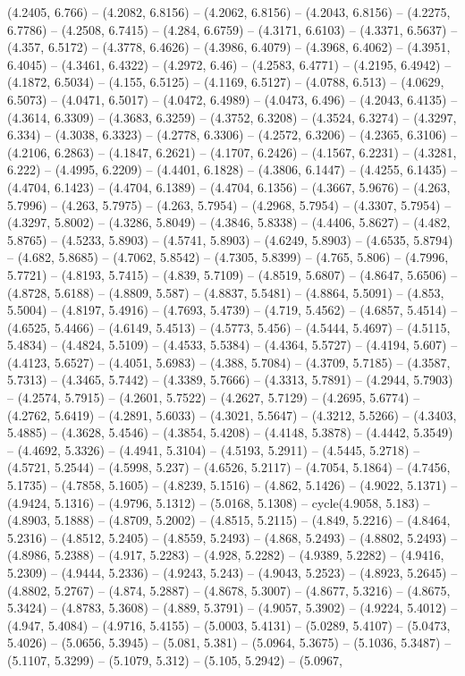 (4.2405, 6.766) -- (4.2082, 6.8156) -- (4.2062, 6.8156) -- (4.2043, 6.8156) -- (4.2275, 6.7786) -- (4.2508, 6.7415) -- (4.284, 6.6759) -- (4.3171, 6.6103) -- (4.3371, 6.5637) -- (4.357, 6.5172) -- (4.3778, 6.4626) -- (4.3986, 6.4079) -- (4.3968, 6.4062) -- (4.3951, 6.4045) -- (4.3461, 6.4322) -- (4.2972, 6.46) -- (4.2583, 6.4771) -- (4.2195, 6.4942) -- (4.1872, 6.5034) -- (4.155, 6.5125) -- (4.1169, 6.5127) -- (4.0788, 6.513) -- (4.0629, 6.5073) -- (4.0471, 6.5017) -- (4.0472, 6.4989) -- (4.0473, 6.496) -- (4.2043, 6.4135) -- (4.3614, 6.3309) -- (4.3683, 6.3259) -- (4.3752, 6.3208) -- (4.3524, 6.3274) -- (4.3297, 6.334) -- (4.3038, 6.3323) -- (4.2778, 6.3306) -- (4.2572, 6.3206) -- (4.2365, 6.3106) -- (4.2106, 6.2863) -- (4.1847, 6.2621) -- (4.1707, 6.2426) -- (4.1567, 6.2231) -- (4.3281, 6.222) -- (4.4995, 6.2209) -- (4.4401, 6.1828) -- (4.3806, 6.1447) -- (4.4255, 6.1435) -- (4.4704, 6.1423) -- (4.4704, 6.1389) -- (4.4704, 6.1356) -- (4.3667, 5.9676) -- (4.263, 5.7996) -- (4.263, 5.7975) -- (4.263, 5.7954) -- (4.2968, 5.7954) -- (4.3307, 5.7954) -- (4.3297, 5.8002) -- (4.3286, 5.8049) -- (4.3846, 5.8338) -- (4.4406, 5.8627) -- (4.482, 5.8765) -- (4.5233, 5.8903) -- (4.5741, 5.8903) -- (4.6249, 5.8903) -- (4.6535, 5.8794) -- (4.682, 5.8685) -- (4.7062, 5.8542) -- (4.7305, 5.8399) -- (4.765, 5.806) -- (4.7996, 5.7721) -- (4.8193, 5.7415) -- (4.839, 5.7109) -- (4.8519, 5.6807) -- (4.8647, 5.6506) -- (4.8728, 5.6188) -- (4.8809, 5.587) -- (4.8837, 5.5481) -- (4.8864, 5.5091) -- (4.853, 5.5004) -- (4.8197, 5.4916) -- (4.7693, 5.4739) -- (4.719, 5.4562) -- (4.6857, 5.4514) -- (4.6525, 5.4466) -- (4.6149, 5.4513) -- (4.5773, 5.456) -- (4.5444, 5.4697) -- (4.5115, 5.4834) -- (4.4824, 5.5109) -- (4.4533, 5.5384) -- (4.4364, 5.5727) -- (4.4194, 5.607) -- (4.4123, 5.6527) -- (4.4051, 5.6983) -- (4.388, 5.7084) -- (4.3709, 5.7185) -- (4.3587, 5.7313) -- (4.3465, 5.7442) -- (4.3389, 5.7666) -- (4.3313, 5.7891) -- (4.2944, 5.7903) -- (4.2574, 5.7915) -- (4.2601, 5.7522) -- (4.2627, 5.7129) -- (4.2695, 5.6774) -- (4.2762, 5.6419) -- (4.2891, 5.6033) -- (4.3021, 5.5647) -- (4.3212, 5.5266) -- (4.3403, 5.4885) -- (4.3628, 5.4546) -- (4.3854, 5.4208) -- (4.4148, 5.3878) -- (4.4442, 5.3549) -- (4.4692, 5.3326) -- (4.4941, 5.3104) -- (4.5193, 5.2911) -- (4.5445, 5.2718) -- (4.5721, 5.2544) -- (4.5998, 5.237) -- (4.6526, 5.2117) -- (4.7054, 5.1864) -- (4.7456, 5.1735) -- (4.7858, 5.1605) -- (4.8239, 5.1516) -- (4.862, 5.1426) -- (4.9022, 5.1371) -- (4.9424, 5.1316) -- (4.9796, 5.1312) -- (5.0168, 5.1308) -- cycle(4.9058, 5.183) -- (4.8903, 5.1888) -- (4.8709, 5.2002) -- (4.8515, 5.2115) -- (4.849, 5.2216) -- (4.8464, 5.2316) -- (4.8512, 5.2405) -- (4.8559, 5.2493) -- (4.868, 5.2493) -- (4.8802, 5.2493) -- (4.8986, 5.2388) -- (4.917, 5.2283) -- (4.928, 5.2282) -- (4.9389, 5.2282) -- (4.9416, 5.2309) -- (4.9444, 5.2336) -- (4.9243, 5.243) -- (4.9043, 5.2523) -- (4.8923, 5.2645) -- (4.8802, 5.2767) -- (4.874, 5.2887) -- (4.8678, 5.3007) -- (4.8677, 5.3216) -- (4.8675, 5.3424) -- (4.8783, 5.3608) -- (4.889, 5.3791) -- (4.9057, 5.3902) -- (4.9224, 5.4012) -- (4.947, 5.4084) -- (4.9716, 5.4155) -- (5.0003, 5.4131) -- (5.0289, 5.4107) -- (5.0473, 5.4026) -- (5.0656, 5.3945) -- (5.081, 5.381) -- (5.0964, 5.3675) -- (5.1036, 5.3487) -- (5.1107, 5.3299) -- (5.1079, 5.312) -- (5.105, 5.2942) -- (5.0967, 